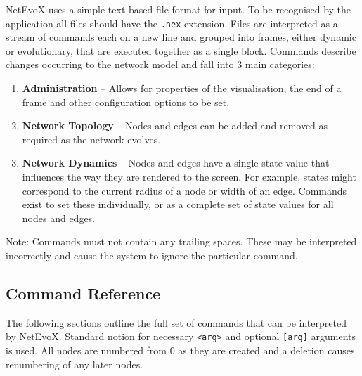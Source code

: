 \documentclass[a4paper, 11pt]{article}
\begin{document}
NetEvoX uses a simple text-based file format for input. To be recognised by the application all files should have the \texttt{.nex} extension. Files are interpreted as a stream of commands each on a new line and grouped into frames, either dynamic or evolutionary, that are executed together as a single block. Commands describe changes occurring to the network model and fall into 3 main categories:
\begin{enumerate}
	\item \textbf{Administration} -- Allows for properties of the visualisation, the end of a frame and other configuration options to be set.
	
	\item \textbf{Network Topology} -- Nodes and edges can be added and removed as required as the network evolves.
	
	\item \textbf{Network Dynamics} -- Nodes and edges have a single state value that influences the way they are rendered to the screen. For example, states might correspond to the current radius of a node or width of an edge. Commands exist to set these individually, or as a complete set of state values for all nodes and edges.
\end{enumerate}
Note: Commands must not contain any trailing spaces. These may be interpreted incorrectly and cause the system to ignore the particular command.

\subsection{Command Reference}

The following sections outline the full set of commands that can be interpreted by NetEvoX. Standard notion for necessary \texttt{<arg>} and optional \texttt{[arg]} arguments is used. All nodes are numbered from 0 as they are created and a deletion causes renumbering of any later nodes.
\end{document}
